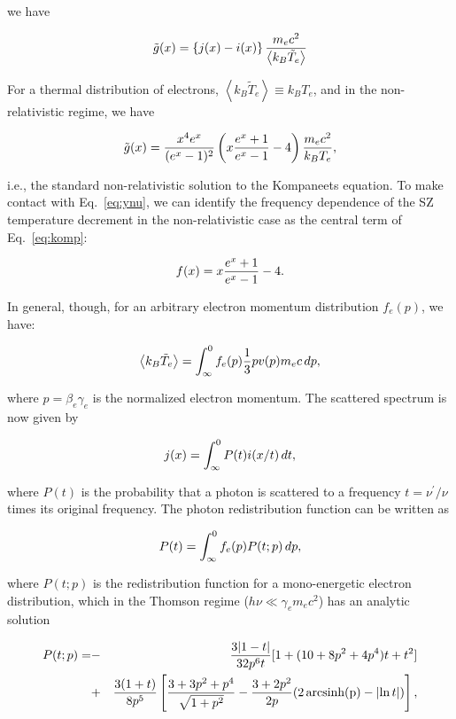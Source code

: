 we have

\begin{equation}
\tilde{g}(x) = \left\{j(x) - i(x)\right\}{{m_e c^2}\over{\left<k_B\tilde{T}_e\right>}}
\label{eq:ggen}
\end{equation}

For a thermal distribution of electrons, $\left<k_B\tilde{T}_e\right>
\equiv k_B T_e$, and in the non-relativistic regime, we have

\begin{equation}
\tilde{g}(x) = {{x^4e^x}\over{(e^x-1)^2}}\left(x{{e^x+1}\over{e^x-1}} - 4\right) {{m_e c^2}\over{k_B T_e}},
\label{eq:komp}
\end{equation}

i.e., the standard non-relativistic solution to the Kompaneets
equation.  To make contact with Eq.~\ref{eq:ynu}, we can identify the
frequency dependence of the SZ temperature decrement in the
non-relativistic case as the central term of Eq.~\ref{eq:komp}:

\begin{equation}
f(x) = x{{e^x+1}\over{e^x-1}} - 4.
\label{eq:fnu}
\end{equation}

In general, though, for an arbitrary electron momentum
distribution $f_e(p)$, we have:

\begin{equation}
\left<k_B\tilde{T}_e\right> = \int^{0}_{\infty}{f_e(p) {1\over{3}}pv(p)m_e c\,dp},
\end{equation}

where $p = \beta_e\gamma_e$ is the normalized electron momentum. The
scattered spectrum is now given by

\begin{equation}
j(x) = \int^{0}_{\infty}{P(t)i(x/t)\,dt},
\end{equation}

where $P(t)$ is the probability that a photon is scattered to a
frequency $t = \nu^\prime/\nu$ times its original frequency.  The
photon redistribution function can be written as

\begin{equation}
P(t) = \int^{0}_{\infty}{f_e(p)P(t;p)\,dp},
\end{equation}

where $P(t;p)$ is the redistribution function for a mono-energetic
electron distribution, which in the Thomson regime ($h\nu \ll \gamma_e
m_e c^2$) has an analytic solution

\begin{eqnarray}\nonumber
P(t;p) = &-& {{3|1-t|}\over{32p^6t}} [1 + (10 + 8p^2 + 4p^4)t + t^2]\\\nonumber
         &+& {{3(1+t)}\over{8p^5}}\left[{{3+3p^2 + p^4}\over{\sqrt{1+p^2}}} - {{3+2p^2}\over{2p}}(2{\rm\,arcsinh(p)} - \left|\ln{t}\right|)\right],
\end{eqnarray}

